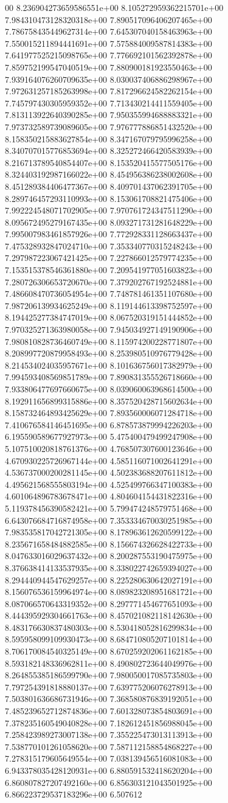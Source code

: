 00	8.236904273659586551e+00	8.105272959362215701e+00	7.984310473128320318e+00	7.890517096406207465e+00	7.786758435449627314e+00	7.645307040158463963e+00	7.550015211894441691e+00	7.575884009587814383e+00	7.641977525215098765e+00	7.776692101562392878e+00	7.859752199547040519e+00	7.880900181923550463e+00	7.939164076260709635e+00	8.030037406886298967e+00	7.972631257185263998e+00	7.817296624582262154e+00	7.745797430305959352e+00	7.713430214411559405e+00	7.813113922640390285e+00	7.950355994688883321e+00	7.973732589739089605e+00	7.976777886851432520e+00	8.158350215883627854e+00	8.347167079795996258e+00	8.340707015776853694e+00	8.325272466420583939e+00	8.216713789540854407e+00	8.153520415577505176e+00	8.324403192987166022e+00	8.454956386238002608e+00	8.451289384406477367e+00	8.409701437062391705e+00	8.289746457293110993e+00	8.153061708821475406e+00	7.992224548071702905e+00	7.970761724347511290e+00	8.095672495279167435e+00	8.093271731281648229e+00	7.995007983461857926e+00	7.772928331128663437e+00	7.475328932847024710e+00	7.353340770315248243e+00	7.297987223067421425e+00	7.227866012579774235e+00	7.153515378546361880e+00	7.209541977051603823e+00	7.280726306653720670e+00	7.379202767192524881e+00	7.486608470736054954e+00	7.748781461351107680e+00	7.987206139934625249e+00	8.119144613398752597e+00	8.194425277384747019e+00	8.067520319151444852e+00	7.970325271363980058e+00	7.945034927149190906e+00	7.980810828736460749e+00	8.115974200228771807e+00	8.208997720879958493e+00	8.253980510976779428e+00	8.214534024035957671e+00	8.101636756017382979e+00	7.994593408569851789e+00	7.890831355526718660e+00	7.933806477697660675e+00	8.039060063968614500e+00	8.192911656899315886e+00	8.357520428715602634e+00	8.158732464893425629e+00	7.893560006071284718e+00	7.410676584146451695e+00	6.878573879994226203e+00	6.195590589677927973e+00	5.475400479499247908e+00	5.107510020818761376e+00	4.768507307600123646e+00	4.670930225726967144e+00	4.585116071002641291e+00	4.536737000200281145e+00	4.502383688207611812e+00	4.495621568555803194e+00	4.525499766347100383e+00	4.601064896783678471e+00	4.804604154431822316e+00	5.119378456390582421e+00	5.799474248579751468e+00	6.643076684716874958e+00	7.353334670030251985e+00	7.983535817042721305e+00	8.178963612620599122e+00	8.235671658484882585e+00	8.156674326628422733e+00	8.047633016029637432e+00	8.200287553190475975e+00	8.376638414133537935e+00	8.338022742659394027e+00	8.294440944547629257e+00	8.225280630642027191e+00	8.156076536159964974e+00	8.089823208951681721e+00	8.087066570643319352e+00	8.297771454677651093e+00	8.444395929304661763e+00	8.457021082118142630e+00	8.483176630837480303e+00	8.530418052816299834e+00	8.595958099109930473e+00	8.684710805207101814e+00	8.706170084540325149e+00	8.670259202061162185e+00	8.593182148336962811e+00	8.490802723644049976e+00	8.264855385186599790e+00	7.980050017085735803e+00	7.797254391818880137e+00	7.639775206076278913e+00	7.503801636686731946e+00	7.368580876839192051e+00	7.485239652712874836e+00	7.601328073854803691e+00	7.378235160549040828e+00	7.182612451856988045e+00	7.258423989273007138e+00	7.355225473013113913e+00	7.538770101261058620e+00	7.587112158854868227e+00	7.278315179605649554e+00	7.038139456516081083e+00	6.943378035428120931e+00	6.880591532418620204e+00	6.860807827207492160e+00	6.856303121043501925e+00	6.866223729537183296e+00	6.507612